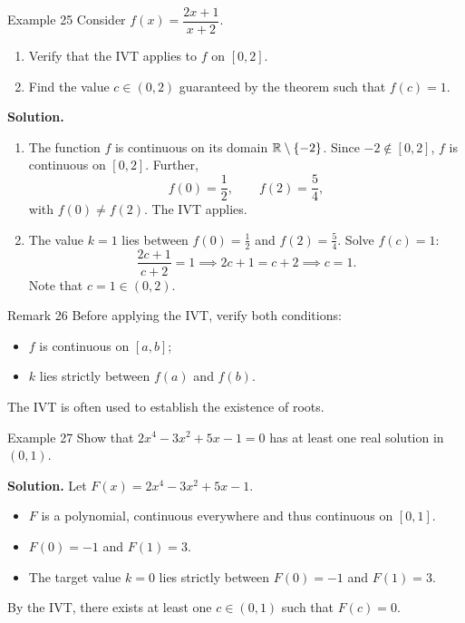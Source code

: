 \begin{examplebox}{Example 25}
Consider \(f(x) = \dfrac{2x + 1}{x + 2}\).
\begin{enumerate}
    \item[(a)] Verify that the IVT applies to \(f\) on \([0, 2]\).
    \item[(b)] Find the value \(c \in (0, 2)\) guaranteed by the theorem such that \(f(c) = 1\).
\end{enumerate}

\medskip
\textbf{Solution.}
\begin{enumerate}
    \item[(a)] The function \(f\) is continuous on its domain \(\mathbb{R} \setminus \{-2\}\). Since \(-2 \notin [0, 2]\), \(f\) is continuous on \([0, 2]\). Further,
    \[
    f(0) = \frac{1}{2}, \qquad f(2) = \frac{5}{4},
    \]
    with \(f(0) \neq f(2)\). The IVT applies.

    \item[(b)] The value \(k = 1\) lies between \(f(0) = \frac{1}{2}\) and \(f(2) = \frac{5}{4}\). Solve \(f(c) = 1\):
    \[
    \frac{2c + 1}{c + 2} = 1 \implies 2c + 1 = c + 2 \implies c = 1.
    \]
    Note that \(c = 1 \in (0, 2)\).
\end{enumerate}
\end{examplebox}

\begin{remarkbox}{Remark 26}
Before applying the IVT, verify both conditions:
\begin{itemize}
    \item \(f\) is continuous on \([a, b]\);
    \item \(k\) lies strictly between \(f(a)\) and \(f(b)\).
\end{itemize}
\end{remarkbox}

The IVT is often used to establish the existence of roots.

\begin{examplebox}{Example 27}
Show that \(2x^{4} - 3x^{2} + 5x - 1 = 0\) has at least one real solution in \((0, 1)\).

\medskip
\textbf{Solution.}
Let \(F(x) = 2x^{4} - 3x^{2} + 5x - 1\).
\begin{itemize}
    \item \(F\) is a polynomial, continuous everywhere and thus continuous on \([0, 1]\).
    \item \(F(0) = -1\) and \(F(1) = 3\).
    \item The target value \(k = 0\) lies strictly between \(F(0) = -1\) and \(F(1) = 3\).
\end{itemize}
By the IVT, there exists at least one \(c \in (0, 1)\) such that \(F(c) = 0\).
\end{examplebox}

